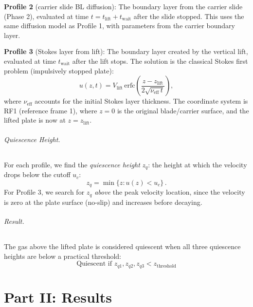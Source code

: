 \documentclass[11pt,a4paper]{article}
\begin{document}
\textbf{Profile 2} (carrier slide BL diffusion): The boundary layer from
the carrier slide (Phase 2), evaluated at time $t = t_\mathrm{lift} +
t_\mathrm{wait}$ after the slide stopped. This uses the same diffusion
model as Profile 1, with parameters from the carrier boundary layer.

\textbf{Profile 3} (Stokes layer from lift): The boundary layer created
by the vertical lift, evaluated at time $t_\mathrm{wait}$ after the lift
stops. The solution is the classical Stokes first problem (impulsively
stopped plate):
\begin{equation}
  u(z, t) = V_\mathrm{lift}\,\mathrm{erfc}\!\left(\frac{z - z_\mathrm{lift}}{2\sqrt{\nu_\mathrm{eff}\,t}}\right),
  \label{eq:stokes_erfc}
\end{equation}
where $\nu_\mathrm{eff}$ accounts for the initial Stokes layer thickness.
The coordinate system is RF1 (reference frame 1), where $z = 0$
is the original blade/carrier surface, and the lifted plate is now at
$z = z_\mathrm{lift}$.

\paragraph{Quiescence Height.}
For each profile, we find the \emph{quiescence height} $z_q$: the height
at which the velocity drops below the cutoff $u_c$:
\begin{equation}
  z_q = \min\{z : u(z) < u_c\}\,.
  \label{eq:zq}
\end{equation}
For Profile 3, we search for $z_q$ \emph{above} the peak velocity location,
since the velocity is zero at the plate surface (no-slip) and increases
before decaying.

\paragraph{Result.}
The gas above the lifted plate is considered quiescent when all three
quiescence heights are below a practical threshold:
\begin{equation}
  \boxed{\text{Quiescent if } z_{q1}, z_{q2}, z_{q3} < z_\mathrm{threshold}}
\end{equation}



\part*{Part II: Results}
\end{document}
